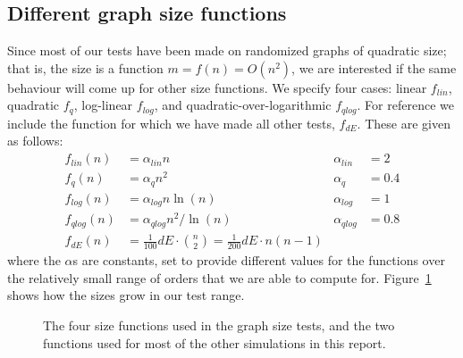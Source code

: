 \documentclass{cslthse-msc}
\newcommand{\density}{dE}
\begin{document}
\subsection{Different graph size functions}\label{differentdensities}
Since most of our tests have been made on randomized graphs of quadratic size; that is, the size is a function $m = f(n) = O(n^2)$, we are interested if the same behaviour will come up for other size functions. We specify four cases: linear $f_{lin}$, quadratic $f_q$, log-linear $f_{log}$, and quadratic-over-logarithmic $f_{qlog}$. For reference we include the function for which we have made all other tests, $f_{\density{}}$. These are given as follows:
\begin{align*}
  f_{lin}(n) & = \alpha_{lin} n & \alpha_{lin} &= 2\\
  f_q(n) & = \alpha_q n^2 & \alpha_{q} &= 0.4 \\
  f_{log}(n) & = \alpha_{log} n \ln(n) & \alpha_{log} &= 1 \\
  f_{qlog}(n) & = \alpha_{qlog} n^2 / \ln(n) & \alpha_{qlog} &= 0.8 \\
  f_{\density{}}(n) & = \frac{1}{100}\density{}\cdot\binom{n}{2} = \frac{1}{200}\density{}\cdot n(n-1) &  &
\end{align*}  
where the $\alpha$s are constants, set to provide different values for the functions over the relatively small range of orders that we are able to compute for. Figure~\ref{densities} shows how the sizes grow in our test range.

\begin{figure}[b]
 \centering
{}
 \caption{The four size functions used in the graph size tests, and the two functions used for most of the other simulations in this report.}
 \label{densities}
\end{figure}
\end{document}
